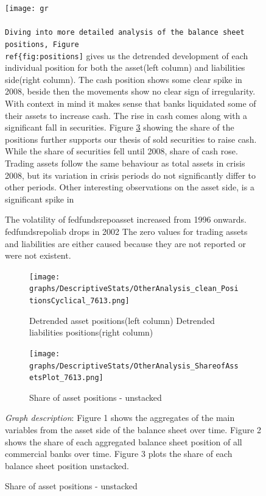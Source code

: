 \documentclass[12pt, a4paper]{article} %
\begin{document}
  
\begin{figure}[hbtp]
\centering
\caption{Asset side}
\texttt{[image: gr\\\\

Diving into more detailed analysis of the balance sheet positions, Figure \\ref\{fig:positions]} gives us the detrended development of each individual position for both the asset(left column) and liabilities side(right column).
The cash position shows some clear spike in 2008, beside then the movements show no clear sign of irregularity. With context in mind it makes sense that banks liquidated some of their assets to increase cash. The rise in cash comes along with a significant fall in securities. Figure \ref{fig:sharepositions} showing the share of the positions further supports our thesis of sold securities to raise cash. While the share of securities fell until 2008, share of cash rose.
Trading assets follow the same behaviour as total assets in crisis 2008, but its variation in crisis periods do not significantly differ to other periods.  
Other interesting observations on the asset side, is a significant spike in

The volatility of fedfundsrepoasset increased from 1996 onwards. 
fedfundsrepoliab drops in 2002
The zero values for trading assets and liabilities are either caused because they are not reported or were not existent. 

\begin{figure}[hbtp]
\centering
\caption{Detrended asset positions(left column) \hspace{2cm} Detrended liabilities positions(right column)}
\texttt{[image: graphs/DescriptiveStats/OtherAnalysis\_clean\_PositionsCyclical\_7613.png]}
\label{fig:positions}
\end{figure}


\begin{figure}[hbtp]
\centering
\caption{Share of asset positions - unstacked}
\texttt{[image: graphs/DescriptiveStats/OtherAnalysis\_ShareofAssetsPlot\_7613.png]}
\label{fig:sharepositions}
\end{figure}


\noindent \textit{Graph description}: Figure 1 shows the aggregates of the main variables from the asset side of the balance sheet over time. Figure 2 shows the share of each aggregated balance sheet position of all commercial banks over time. Figure 3 plots the share of each balance sheet position unstacked.\\



\end{figure}
\end{document}
